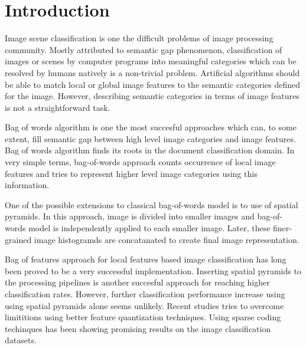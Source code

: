 \documentclass[conference]{IEEEtran}
\begin{document}


%
\IEEEpeerreviewmaketitle

\IEEEpubidadjcol

\section{Introduction}

Image scene classification is one the difficult problems of image processing community. Mostly attributed to semantic gap phenomenon, classification of images or scenes by computer programs into meaningful categories which can be resolved by humans natively is a non-trivial problem. Artificial algorithms  should be able to match local or global image features to the semantic categories defined for the image. However, describing semantic categories in terms of image features is not a straightforward task.

Bag of words algorithm is one the most succesful approaches which can, to some extent, fill semantic gap between high level image categories and image features. Bag of words algorithm finds its roots in the document classification domain. In very simple terms, bag-of-words approach counts occurrence of local image features and tries to represent higher level image categories using this information.

One of the possible extensions to classical bag-of-words model is to use of spatial pyramids. In this approach, image is divided into smaller images and bag-of-words model is independently applied to each smaller image. Later, these finer-grained image histogramds are concatanated to create final image representation.

Bag of features approach for local features based image classification has long been proved to be a very successful implementation. Inserting spatial pyramids to the processing pipelines is another succesful approach for reaching higher classification rates. However, further classification performance increase using using spatial pyramids alone seems unlikely. Recent studies tries to overcome limititions using better feature quantization techniques. Using sparse coding techinques has been showing promising results on the image classification datasets.
\end{document}
